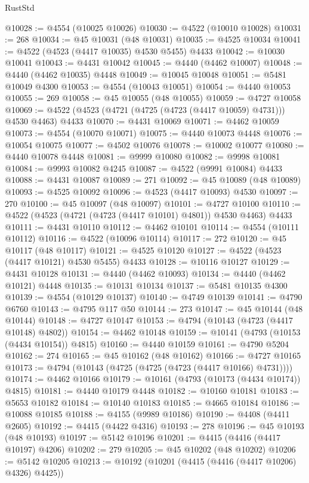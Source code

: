 \begin{lexlean}{RustStd}
\begin{coremodule}
{\begin{coremodule}
{{{{{{{{{{{{{{{{{{{{{{{{{{{{{{{{{{{{{{{{{{{{{{{{{{{{{{{{{{{{@10028 := @4554 (@10025 @10026)
@10030 := @4522 (@10010 @10028)
@10031 := 268
@10034 := @45 @10031 (@48 @10031)
@10035 := @4525 @10034
@10041 := @4522 (@4523 (@4417 @10035) @4530 @5455) @4433
@10042 := @10030 @10041
@10043 := @4431 @10042
@10045 := @4440 (@4462 @10007)
@10048 := @4440 (@4462 @10035) @4448
@10049 := @10045 @10048
@10051 := @5481 @10049 @4300
@10053 := @4554 (@10043 @10051)
@10054 := @4440 @10053
@10055 := 269
@10058 := @45 @10055 (@48 @10055)
@10059 := @4727 @10058
@10069 := @4522 (@4523 (@4721 (@4725 (@4723 (@4417 @10059) @4731))) @4530 @4463) @4433
@10070 := @4431 @10069
@10071 := @4462 @10059
@10073 := @4554 (@10070 @10071)
@10075 := @4440 @10073 @4448
@10076 := @10054 @10075
@10077 := @4502 @10076
@10078 := @10002 @10077
@10080 := @4440 @10078 @4448
@10081 := @9999 @10080
@10082 := @9998 @10081
@10084 := @9993 @10082 @4245
@10087 := @4522 (@9991 @10084) @4433
@10088 := @4431 @10087
@10089 := 271
@10092 := @45 @10089 (@48 @10089)
@10093 := @4525 @10092
@10096 := @4523 (@4417 @10093) @4530
@10097 := 270
@10100 := @45 @10097 (@48 @10097)
@10101 := @4727 @10100
@10110 := @4522 (@4523 (@4721 (@4723 (@4417 @10101) @4801)) @4530 @4463) @4433
@10111 := @4431 @10110
@10112 := @4462 @10101
@10114 := @4554 (@10111 @10112)
@10116 := @4522 (@10096 @10114)
@10117 := 272
@10120 := @45 @10117 (@48 @10117)
@10121 := @4525 @10120
@10127 := @4522 (@4523 (@4417 @10121) @4530 @5455) @4433
@10128 := @10116 @10127
@10129 := @4431 @10128
@10131 := @4440 (@4462 @10093)
@10134 := @4440 (@4462 @10121) @4448
@10135 := @10131 @10134
@10137 := @5481 @10135 @4300
@10139 := @4554 (@10129 @10137)
@10140 := @4749 @10139
@10141 := @4790 @6760
@10143 := @4795 @117 @50
@10144 := 273
@10147 := @45 @10144 (@48 @10144)
@10148 := @4727 @10147
@10153 := @4794 (@10143 (@4723 (@4417 @10148) @4802))
@10154 := @4462 @10148
@10159 := @10141 (@4793 (@10153 (@4434 @10154)) @4815)
@10160 := @4440 @10159
@10161 := @4790 @5204
@10162 := 274
@10165 := @45 @10162 (@48 @10162)
@10166 := @4727 @10165
@10173 := @4794 (@10143 (@4725 (@4725 (@4723 (@4417 @10166) @4731))))
@10174 := @4462 @10166
@10179 := @10161 (@4793 (@10173 (@4434 @10174)) @4815)
@10181 := @4440 @10179 @4448
@10182 := @10160 @10181
@10183 := @5653 @10182
@10184 := @10140 @10183
@10185 := @4665 @10184
@10186 := @10088 @10185
@10188 := @4155 (@9989 @10186)
@10190 := @4408 (@4411 @2605)
@10192 := @4415 (@4422 @4316)
@10193 := 278
@10196 := @45 @10193 (@48 @10193)
@10197 := @5142 @10196
@10201 := @4415 (@4416 (@4417 @10197) @4206)
@10202 := 279
@10205 := @45 @10202 (@48 @10202)
@10206 := @5142 @10205
@10213 := @10192 (@10201 (@4415 (@4416 (@4417 @10206) @4326) @4425))
}}}}}}}}}}}}}}}}}}}}}}}}}}}}}}}}}}}}}}}}}}}}}}}}}}}}}}}}}}}}
\end{coremodule}}
\end{coremodule}
\end{lexlean}
